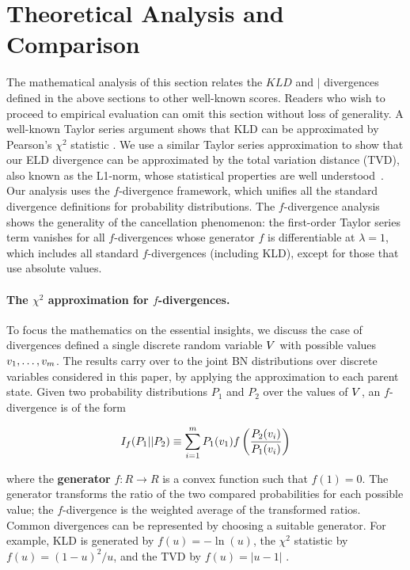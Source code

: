 {\section{Theoretical Analysis and Comparison}
The mathematical analysis of this section relates the $KLD$ and $\mid$ divergences defined in the above sections to other well-known scores. Readers who wish to proceed to empirical evaluation can omit this section without loss of generality. A well-known Taylor series argument shows that KLD can be approximated by Pearson's $\chi^{2}$ statistic \citep{Nielsen2014}. We use a similar Taylor series approximation to show that our ELD divergence can be approximated by the total variation distance (TVD), also known as the L1-norm, whose statistical properties are well understood~\citep{Beirlant2001,Beirlant1994}. 
Our analysis uses the $f$-divergence framework, which unifies all the standard divergence definitions for probability distributions. The $f$-divergence analysis shows the generality of the cancellation phenomenon: the first-order Taylor series term vanishes for all $f$-divergences whose generator $f$ is differentiable at $\lambda = 1$, which includes all standard $f$-divergences (including KLD), except for those that use absolute values. 

\paragraph{The $\chi^2$ approximation for $f$-divergences.}
To focus the mathematics on the essential insights, we discuss the case of divergences defined a single discrete random variable $V$ with possible values $v_{1},\ldots,v_{m}$. The results carry over to the joint BN distributions over discrete variables considered in this paper, by applying the approximation to each parent state. Given two probability distributions $P_{1}$ and $P_{2}$ over the values of $V$, an $f$-divergence is of the form 

\begin{equation}
\label{eq:f-divergence}
I_{f}(P_{1}||P_{2}) \equiv \sum_{i=1}^{m} P_{1}(v_{1}) f\left(\frac{P_{2}(v_{i})}{P_{1}(v_{i})}\right)
\end{equation}

where the \textbf{generator} $f:R \rightarrow R$ is a convex function such that $f(1)=0$. 
The generator transforms the ratio of the two compared probabilities for each possible value; the $f$-divergence is the weighted average of the transformed ratios. Common divergences can be represented by choosing a suitable generator. For example, KLD is generated by $f(u) = -\ln(u)$, the $\chi^{2}$ statistic by $f(u) = (1-u)^{2}/u$, and the TVD by $f(u) = |u-1|$ \citep{Nielsen2014}. 

}
